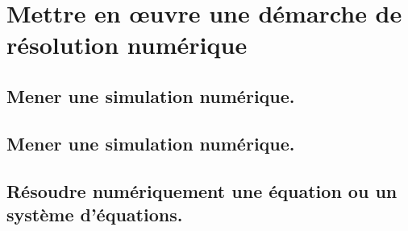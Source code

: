 \documentclass[10pt,fleqn]{book}
\newcommand{\repRel}{../..}
\newcommand{\repStyle}{\repRel/Style}
\newcommand{\td}{fichier_td}
\newcommand{\repExos}{\repRel/ExercicesCompetences}
\newcommand{\repExo}{dossier}
\begin{document}
\renewcommand{\repExo}{\repExos/C2_MettreEnOeuvreDemarche/C2_09_DeterminerLoiMouvement_TEC/17_4Barres}
\renewcommand{\td}{17_4Barres}
\graphicspath{{\repStyle/png/}{\repExo/images/}}


\renewcommand{\repExo}{\repExos/C2_MettreEnOeuvreDemarche/C2_09_DeterminerLoiMouvement_TEC/18_Maxpid}
\renewcommand{\td}{18_Maxpid}
\graphicspath{{\repStyle/png/}{\repExo/images/}}


\renewcommand{\repExo}{\repExos/C2_MettreEnOeuvreDemarche/C2_09_DeterminerLoiMouvement_TEC/19_Graham}
\renewcommand{\td}{19_Graham}
\graphicspath{{\repStyle/png/}{\repExo/images/}}


\renewcommand{\repExo}{\repExos/C2_MettreEnOeuvreDemarche/C2_09_DeterminerLoiMouvement_TEC/20_VariateurBilles}
\renewcommand{\td}{20_VariateurBilles}
\graphicspath{{\repStyle/png/}{\repExo/images/}}


\renewcommand{\repExo}{\repExos/C2_MettreEnOeuvreDemarche/C2_09_DeterminerLoiMouvement_TEC/49_ElevateurBateaux}
\renewcommand{\td}{49_ElevateurBateaux}
\graphicspath{{\repStyle/png/}{\repExo/images/}}


\renewcommand{\repExo}{\repExos/C2_MettreEnOeuvreDemarche/C2_09_DeterminerLoiMouvement_TEC/50_BancBalafre}
\renewcommand{\td}{50_BancBalafre}
\graphicspath{{\repStyle/png/}{\repExo/images/}}


\renewcommand{\repExo}{\repExos/C2_MettreEnOeuvreDemarche/C2_09_DeterminerLoiMouvement_TEC/64_EPAS}
\renewcommand{\td}{64_EPAS}
\graphicspath{{\repStyle/png/}{\repExo/images/}}


\section{Mettre en œuvre une démarche de résolution numérique} 

\subsection{Mener une simulation numérique. } 

\subsection{Mener une simulation numérique. } 

\subsection{Résoudre numériquement une équation ou un système d'équations. } 
\end{document}
